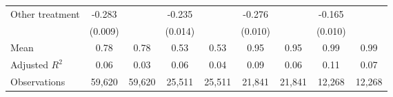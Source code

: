 {\begin{tabular}{l*{8}{c}}
Other treatment     &      -0.283\sym{***}&                     &      -0.235\sym{***}&                     &      -0.276\sym{***}&                     &      -0.165\sym{***}&                     \\
                    &     (0.009)         &                     &     (0.014)         &                     &     (0.010)         &                     &     (0.010)         &                     \\
\hline
Mean                &        0.78         &        0.78         &        0.53         &        0.53         &        0.95         &        0.95         &        0.99         &        0.99         \\
Adjusted \(R^{2}\)  &        0.06         &        0.03         &        0.06         &        0.04         &        0.09         &        0.06         &        0.11         &        0.07         \\
Observations        &      59,620         &      59,620         &      25,511         &      25,511         &      21,841         &      21,841         &      12,268         &      12,268         \\
\hline\hline
\end{tabular}
}
